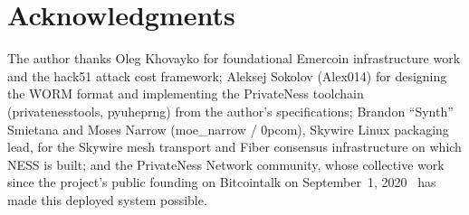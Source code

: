 \documentclass[12pt,a4paper]{article}
\begin{document}
\section*{Acknowledgments}

The author thanks Oleg Khovayko for foundational Emercoin infrastructure
work and the hack51 attack cost framework; Aleksej Sokolov (Alex014) for
designing the WORM format and implementing the PrivateNess toolchain
(privatenesstools, pyuheprng) from the author's specifications; Brandon
``Synth'' Smietana and Moses Narrow (moe\_narrow / 0pcom), Skywire Linux
packaging lead, for the Skywire mesh transport and Fiber consensus
infrastructure on which NESS is built; and the PrivateNess Network
community, whose collective work since the project's public founding on
Bitcointalk on September~1, 2020~\cite{BTT20} has made this deployed
system possible.
\end{document}
